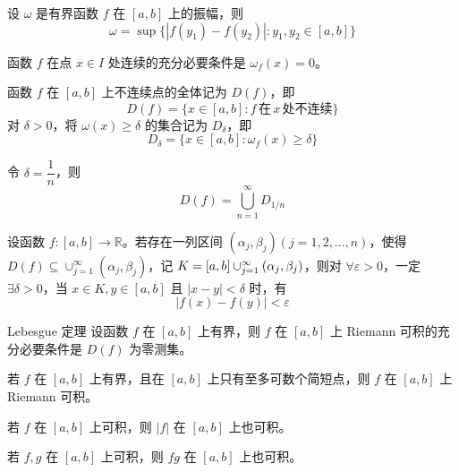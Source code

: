 \begin{lemma}
    设 $\omega$ 是有界函数 $f$ 在 $[a,b]$ 上的振幅，则
    \[\omega = \sup\{|f(y_1) - f(y_2)|:y_1,y_2 \in [a,b]\}\]
\end{lemma}

\begin{lemma}
    函数 $f$ 在点 $x \in I$ 处连续的充分必要条件是 $\omega_f(x) = 0$。
\end{lemma}

\begin{definition}
    函数 $f$ 在 $[a,b]$ 上不连续点的全体记为 $D(f)$，即
    \[D(f) = \{x \in [a,b] : f\, \text{在}\, x\, \text{处不连续}\}\]
    对 $\delta > 0$，将 $\omega(x) \geqslant \delta$ 的集合记为 $D_{\delta}$，即
    \[D_{\delta} = \{x \in [a,b] : \omega_{f}(x) \geqslant \delta\}\]
\end{definition}

\begin{lemma}
    令 $\delta = \dfrac{1}{n}$，则
    \[D(f) = \bigcup_{n = 1}^{\infty}D_{1/n}\]
\end{lemma}

\begin{lemma}
    设函数 $f : [a,b] \to \mathbb{R}$。若存在一列区间 $(\alpha_j,\beta_j)(j = 1,2, \ldots ,n)$，使得 $D(f) \subseteq \cup_{j = 1}^{\infty}(\alpha_j,\beta_j)$，记 $K = [a,b]\\ \cup_{j = 1}^{\infty}(\alpha_j,\beta_j)$，则对 $\forall \varepsilon > 0$，一定 $\exists \delta > 0$，当 $x \in K, y\in [a,b]$ 且 $|x - y| < \delta$ 时，有
    \[|f(x) - f(y)| < \varepsilon\]
\end{lemma}

\begin{theorem}{Lebesgue 定理}
    设函数 $f$ 在 $[a,b]$ 上有界，则 $f$ 在 $[a,b]$ 上 Riemann 可积的充分必要条件是 $D(f)$ 为零测集。
\end{theorem}

\begin{corollary}
    若 $f$ 在 $[a,b]$ 上有界，且在 $[a,b]$ 上只有至多可数个简短点，则 $f$ 在 $[a,b]$ 上 Riemann 可积。
\end{corollary}

\begin{corollary}
    若 $f$ 在 $[a,b]$ 上可积，则 $|f|$ 在 $[a,b]$ 上也可积。
\end{corollary}

\begin{corollary}
    若 $f,g$ 在 $[a,b]$ 上可积，则 $fg$ 在 $[a,b]$ 上也可积。
\end{corollary}

